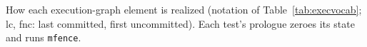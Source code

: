 \providecommand{\figfont}{\fontsize{8pt}{9.5pt}\selectfont}%
\begin{table}[t]
\centering
\caption{How each execution-graph element is realized (notation of Table~\ref{tab:execvocab}; lc, fnc: last committed, first uncommitted). Each test's prologue zeroes its state and runs \texttt{mfence}.}
\label{tab:instrtable}\label{tab:sptable}%
{%
%
%
%
%
%
\figfont%
%
}
\end{table}
